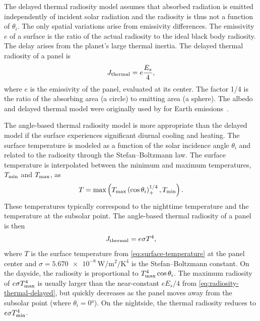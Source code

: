 The delayed thermal radiosity model assumes that absorbed radiation is emitted independently of incident solar radiation and the radiosity is thus not a function of $\theta_i$. The only spatial variations arise from emissivity differences. The emissivity $e$ of a surface is the ratio of the actual radiosity to the ideal black body radiosity. The delay arises from the planet's large thermal inertia. The delayed thermal radiosity of a panel is~\cite{Knocke1988}
\begin{align}
    \label{eq:radiosity-thermal-delayed}
    J_\textnormal{thermal} = e \frac{E_s}{4},
\end{align}
where $e$ is the emissivity of the panel, evaluated at its center. The factor 1/4 is the ratio of the absorbing area (a circle) to emitting area (a sphere). The albedo and delayed thermal model were originally used by \citeauthor{Knocke1988} for Earth emissions~\cite{Knocke1988}.

The angle-based thermal radiosity model is more appropriate than the delayed model if the surface experiences significant diurnal cooling and heating. The surface temperature is modeled as a function of the solar incidence angle $\theta_i$ and related to the radiosity through the Stefan--Boltzmann law. The surface temperature is interpolated between the minimum and maximum temperatures, $T_\textnormal{min}$ and $T_\textnormal{max}$, as~\cite{Lemoine2013}
\begin{align}
    \label{eq:surface-temperature}
    T = \max\left( T_\textnormal{max} \left(\cos\theta_i\right)_+^{1/4}, T_\textnormal{min} \right).
\end{align}
These temperatures typically correspond to the nighttime temperature and the temperature at the subsolar point. The angle-based thermal radiosity of a panel is then~\cite{Lemoine2013}
\begin{align}
    \label{eq:radiosity-thermal-anglebased}
    J_\textnormal{thermal} = e \sigma T^4,
\end{align}
where $T$ is the surface temperature from \cref{eq:surface-temperature} at the panel center and $\sigma = \qty{5.670e-8}{\W\per\m\squared\per\K\tothe{4}}$ is the Stefan--Boltzmann constant. On the dayside, the radiosity is proportional to $T_\textnormal{max}^4\cos\theta_i$. The maximum radiosity of $e \sigma T_\textnormal{max}^4$ is usually larger than the near-constant $e E_s/4$ from \cref{eq:radiosity-thermal-delayed}, but quickly decreases as the panel moves away from the subsolar point (where $\theta_i = \ang{0}$). On the nightside, the thermal radiosity reduces to $e \sigma T_\textnormal{min}^4$.

